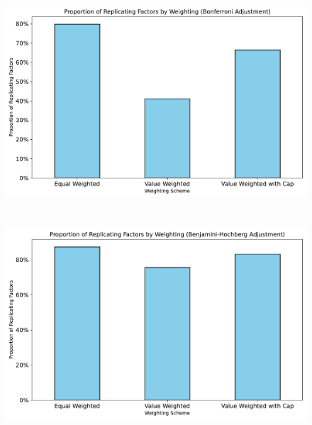 \documentclass[hidelinks,12pt]{article}
\begin{document}
\section{}
\begin{figure}[htbp]
    \centering
    \includegraphics[width=.95\textwidth]{out/4.pdf}
\end{figure}

\FloatBarrier

\section{}
\begin{figure}[htbp]
    \centering
    \includegraphics[width=.95\textwidth]{out/5.pdf}
\end{figure}

\FloatBarrier
\section{}
\begin{table}[htbp]
    \centering
    \resizebox{\textwidth}{!}{%
        
    }
\end{table}
\end{document}
